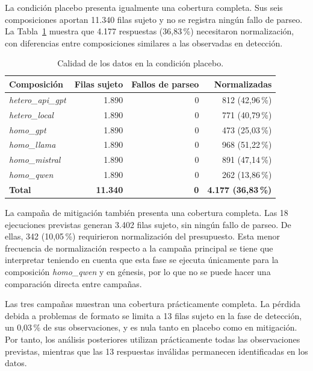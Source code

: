 La condición placebo presenta igualmente una cobertura completa. Sus seis composiciones aportan 11.340 filas sujeto y no se registra ningún fallo de parseo. La Tabla~\ref{tab:calidad_placebo} muestra que 4.177 respuestas (36,83\,\%) necesitaron normalización, con diferencias entre composiciones similares a las observadas en detección.

\begin{table}[htbp]
	\centering
	\caption{Calidad de los datos en la condición placebo.}
	\label{tab:calidad_placebo}
	\small
	\begin{tabular}{p{3.8cm} r r r}
		\hline
		\textbf{Composición} &
		\textbf{Filas sujeto} &
		\textbf{Fallos de parseo} &
		\textbf{Normalizadas} \\
		\hline
		
		\textit{hetero\_api\_gpt}
		& 1.890 & 0 & 812 (42,96\,\%) \\
		
		\textit{hetero\_local}
		& 1.890 & 0 & 771 (40,79\,\%) \\
		
		\textit{homo\_gpt}
		& 1.890 & 0 & 473 (25,03\,\%) \\
		
		\textit{homo\_llama}
		& 1.890 & 0 & 968 (51,22\,\%) \\
		
		\textit{homo\_mistral}
		& 1.890 & 0 & 891 (47,14\,\%) \\
		
		\textit{homo\_qwen}
		& 1.890 & 0 & 262 (13,86\,\%) \\
		
		\hline
		\textbf{Total}
		& \textbf{11.340}
		& \textbf{0}
		& \textbf{4.177 (36,83\,\%)} \\
		\hline
	\end{tabular}
\end{table}

La campaña de mitigación también presenta una cobertura completa. Las 18 ejecuciones previstas generan 3.402 filas sujeto, sin ningún fallo de parseo. De ellas, 342 (10,05\,\%) requirieron normalización del presupuesto. Esta menor frecuencia de normalización respecto a la campaña principal se tiene que interpretar teniendo en cuenta que esta fase se ejecuta únicamente para la composición \textit{homo\_qwen} y en génesis, por lo que no se puede hacer una comparación directa entre campañas.

Las tres campañas muestran una cobertura prácticamente completa. La pérdida debida a problemas de formato se limita a 13 filas sujeto en la fase de detección, un 0,03\,\% de sus observaciones, y es nula tanto en placebo como en mitigación. Por tanto, los análisis posteriores utilizan prácticamente todas las observaciones previstas, mientras que las 13 respuestas inválidas permanecen identificadas en los datos.


